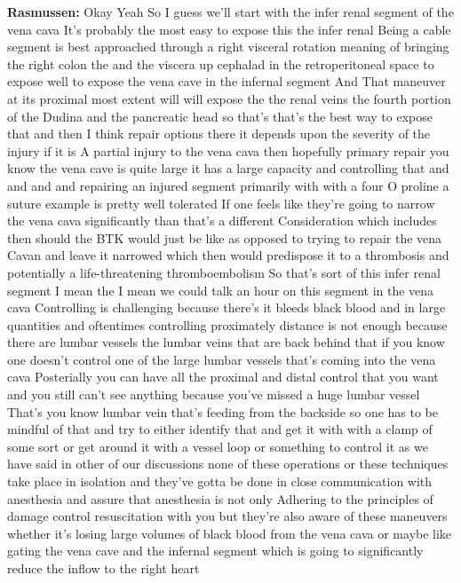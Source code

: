 \documentclass[
]{book}
\begin{document}
\textbf{Rasmussen:} Okay Yeah So I guess we'll start with the infer renal segment of the vena cava It's probably the most easy to expose this the infer renal Being a cable segment is best approached through a right visceral rotation meaning of bringing the right colon the and the viscera up cephalad in the retroperitoneal space to expose well to expose the vena cave in the infernal segment And That maneuver at its proximal most extent will will expose the the renal veins the fourth portion of the Dudina and the pancreatic head so that's that's the best way to expose that and then I think repair options there it depends upon the severity of the injury if it is A partial injury to the vena cava then hopefully primary repair you know the vena cave is quite large it has a large capacity and controlling that and and and and repairing an injured segment primarily with with a four O proline a suture example is pretty well tolerated If one feels like they're going to narrow the vena cava significantly than that's a different Consideration which includes then should the BTK would just be like as opposed to trying to repair the vena Cavan and leave it narrowed which then would predispose it to a thrombosis and potentially a life-threatening thromboembolism So that's sort of this infer renal segment I mean the I mean we could talk an hour on this segment in the vena cava Controlling is challenging because there's it bleeds black blood and in large quantities and oftentimes controlling proximately distance is not enough because there are lumbar vessels the lumbar veins that are back behind that if you know one doesn't control one of the large lumbar vessels that's coming into the vena cava Posterially you can have all the proximal and distal control that you want and you still can't see anything because you've missed a huge lumbar vessel That's you know lumbar vein that's feeding from the backside so one has to be mindful of that and try to either identify that and get it with with a clamp of some sort or get around it with a vessel loop or something to control it as we have said in other of our discussions none of these operations or these techniques take place in isolation and they've gotta be done in close communication with anesthesia and assure that anesthesia is not only Adhering to the principles of damage control resuscitation with you but they're also aware of these maneuvers whether it's losing large volumes of black blood from the vena cava or maybe like gating the vena cave and the infernal segment which is going to significantly reduce the inflow to the right heart
\end{document}
